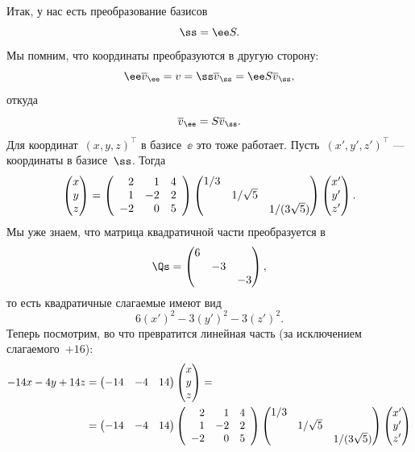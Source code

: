 \begin{solution}
	Итак, у нас есть преобразование базисов
	\[
		\ss = \ee S
		.
	\]
	Мы помним, что координаты преобразуются в другую сторону:
	\[
		\ee \crd{v}_{\ee} = v = \ss \crd{v}_{\ss} =
		\ee S \crd{v}_{\ss},
	\]
	откуда
	\[
		\crd{v}_{\ee} =
		S\crd{v}_{\ss}
		.
	\]
	Для координат~$(x, y, z)^\top$ в базисе~$\ee$ это тоже работает. Пусть~$(x', y', z')^\top$ --- координаты в базисе~$\ss$. Тогда
	\begin{equation}
		\label{eq:num_09:x_to_x':matrix}
		\begin{pmatrix}
			x \\ y \\ z
		\end{pmatrix}
		=
		\left(
			\begin{array}{rrr}
				 2 &  1 & 4 \\
				 1 & -2 & 2 \\
				-2 &  0 & 5
			\end{array}
		\right)
		\begin{pmatrix}
			1/3 \\
			& 1/\sqrt{5} \\
			&& 1/(3\sqrt{5})
		\end{pmatrix}
		\begin{pmatrix}
			x' \\ y' \\ z'
		\end{pmatrix}
		.
	\end{equation}
	Мы уже знаем, что матрица квадратичной части преобразуется в
	\[
		\Qs =
		\begin{pmatrix}
			6 \\
			& -3 \\
			&& -3
		\end{pmatrix},
	\]
	то есть квадратичные слагаемые имеют вид
	\[
		6(x')^2 - 3(y')^2 - 3(z')^2
		.
	\]
	Теперь посмотрим, во что превратится линейная часть (за исключением слагаемого~$+16$):
	\begin{align*}
		-14 x - 4y + 14z &=
		\begin{pmatrix}
			-14 & -4 & 14
		\end{pmatrix}
		\begin{pmatrix}x \\ y \\ z\end{pmatrix}
		= {} \\ {} &=
		\begin{pmatrix}
			-14 & -4 & 14
		\end{pmatrix}
		\left(
			\begin{array}{rrr}
				 2 &  1 & 4 \\
				 1 & -2 & 2 \\
				-2 &  0 & 5
			\end{array}
		\right)
		\begin{pmatrix}
			1/3 \\
			& 1/\sqrt{5} \\
			&& 1/(3\sqrt{5})
		\end{pmatrix}
		\begin{pmatrix}
			x' \\ y' \\ z'
\end{pmatrix}
\end{align*}
\end{solution}
